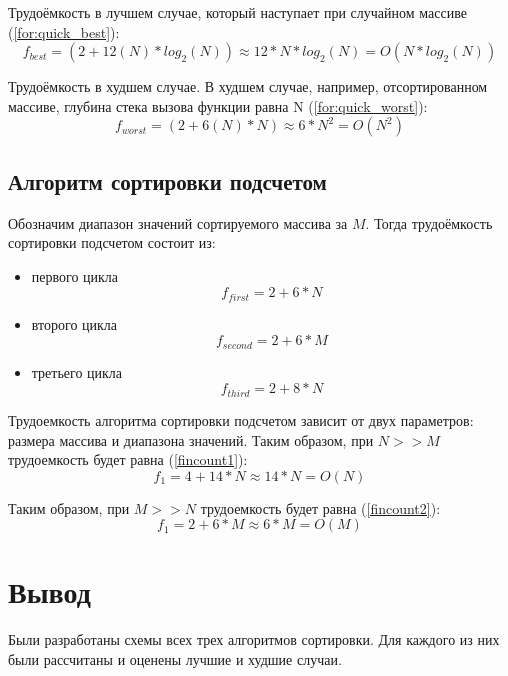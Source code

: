 Трудоёмкость в лучшем случае, который наступает при случайном массиве (\ref{for:quick_best}):
\begin{equation}
	\label{for:quick_best}
	f_{best} = (2 + 12(N) * log_2(N)) \approx 12 * N * log_2(N) = O(N*log_2(N))
\end{equation}

Трудоёмкость в худшем случае. В худшем случае, например, отсортированном массиве, глубина стека вызова функции равна N (\ref{for:quick_worst}):
\begin{equation}
	\label{for:quick_worst}
	f_{worst} = (2 + 6(N) * N) \approx  6 * N ^ 2 = O(N ^ 2)
\end{equation}





\subsection{Алгоритм сортировки подсчетом}

Обозначим диапазон значений сортируемого массива за $M$. Тогда трудоёмкость сортировки подсчетом состоит из:
\begin{itemize}
	\item первого цикла
	\begin{equation}
		\label{for:count1}
		f_{first} = 2 + 6 * N
	\end{equation}
	\item второго цикла
	\begin{equation}
		\label{for:count2}
		f_{second} = 2 + 6 * M
	\end{equation}
	\item третьего цикла
	\begin{equation}
		\label{for:count3}
		f_{third} = 2 + 8 * N
	\end{equation}
\end{itemize}

Трудоемкость алгоритма сортировки подсчетом зависит от двух параметров: размера массива и диапазона значений. Таким образом, при $N >> M$ трудоемкость будет равна (\ref{fincount1}):
\begin{equation}
	\label{fincount1}
	f_{1} = 4 + 14 * N \approx 14 * N = O(N)
\end{equation}

Таким образом, при $M >> N$ трудоемкость будет равна (\ref{fincount2}):
\begin{equation}
	\label{fincount2}
	f_{1} = 2 + 6 * M \approx 6 * M = O(M)
\end{equation}


\section*{Вывод}

Были разработаны схемы всех трех алгоритмов сортировки. Для каждого из них были рассчитаны и оценены лучшие и худшие случаи.


